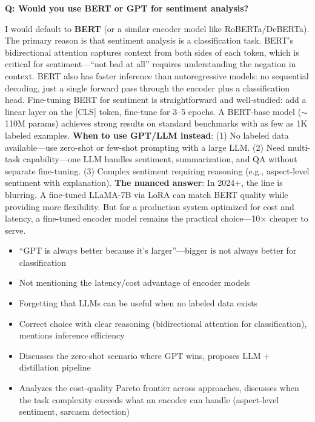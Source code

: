 \begin{interviewq}
\textbf{Q: Would you use BERT or GPT for sentiment analysis?}

 \quad {} \quad \badgefreq{\freqhigh}

\stronganswer I would default to \textbf{BERT} (or a similar encoder model like RoBERTa/DeBERTa). The primary reason is that sentiment analysis is a classification task. BERT's bidirectional attention captures context from both sides of each token, which is critical for sentiment---``not bad at all'' requires understanding the negation in context. BERT also has faster inference than autoregressive models: no sequential decoding, just a single forward pass through the encoder plus a classification head. Fine-tuning BERT for sentiment is straightforward and well-studied: add a linear layer on the [CLS] token, fine-tune for 3--5 epochs. A BERT-base model ($\sim$110M params) achieves strong results on standard benchmarks with as few as 1K labeled examples. \textbf{When to use GPT/LLM instead}: (1) No labeled data available---use zero-shot or few-shot prompting with a large LLM. (2) Need multi-task capability---one LLM handles sentiment, summarization, and QA without separate fine-tuning. (3) Complex sentiment requiring reasoning (e.g., aspect-level sentiment with explanation). \textbf{The nuanced answer}: In 2024+, the line is blurring. A fine-tuned LLaMA-7B via LoRA can match BERT quality while providing more flexibility. But for a production system optimized for cost and latency, a fine-tuned encoder model remains the practical choice---10$\times$ cheaper to serve.

\redflags
\begin{itemize}
    \item ``GPT is always better because it's larger''---bigger is not always better for classification
    \item Not mentioning the latency/cost advantage of encoder models
    \item Forgetting that LLMs can be useful when no labeled data exists
\end{itemize}


\goodgreat
\begin{itemize}
    \item {} Correct choice with clear reasoning (bidirectional attention for classification), mentions inference efficiency
    \item {} Discusses the zero-shot scenario where GPT wins, proposes LLM + distillation pipeline
    \item {} Analyzes the cost-quality Pareto frontier across approaches, discusses when the task complexity exceeds what an encoder can handle (aspect-level sentiment, sarcasm detection)
\end{itemize}

\end{interviewq}

